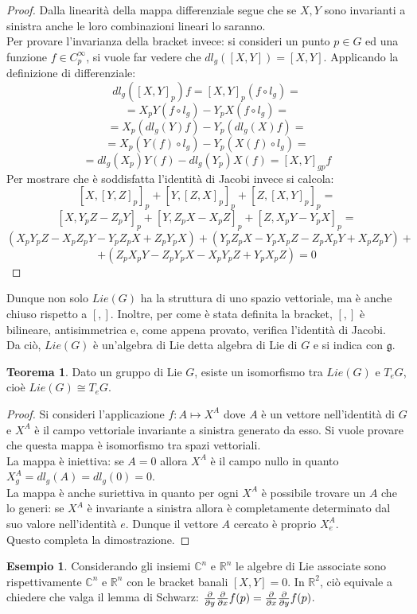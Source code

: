 \documentclass[12pt,a4paper]{report}
\theoremstyle{definition}
\newtheorem{Theo}[Def]{Teorema}
\theoremstyle{definition}
\newtheorem{Ex}[Def]{Esempio}
\theoremstyle{definition}
\theoremstyle{remark}
\begin{document}
\begin{proof}
	Dalla linearità della mappa differenziale segue che se $X,Y$ sono invarianti a sinistra anche le loro combinazioni lineari lo saranno.\\
	Per provare l'invarianza della bracket invece: si consideri un punto $p\in G$ ed una funzione $f\in C^\infty_p$, si vuole far vedere che $dl_g([X,Y])=[X,Y]$.
	Applicando la definizione di differenziale: $$dl_g([X,Y]_p)f=[X,Y]_p(f\circ l_g)=$$$$=X_pY(f\circ l_g)-Y_pX(f\circ l_g)=$$$$=X_p(dl_g(Y)f)-Y_p(dl_g(X)f)=$$
	$$=X_p(Y(f)\circ l_g)-Y_p(X(f)\circ l_g)=$$
	$$=dl_g(X_p)Y(f)-dl_g(Y_p)X(f)=[X,Y]_{gp}f$$ 
	Per mostrare che è soddisfatta l'identità di Jacobi invece si calcola:
	$$[X,[Y,Z]_p]_p+[Y,[Z,X]_p]_p+[Z,[X,Y]_p]_p=$$
	$$[X,Y_pZ-Z_pY]_p+[Y,Z_pX-X_pZ]_p+[Z,X_pY-Y_pX]_p=$$
	$$(X_pY_pZ-X_pZ_pY-Y_pZ_pX+Z_pY_pX)+(Y_pZ_pX-Y_pX_pZ-Z_pX_pY+X_pZ_pY)+$$$$+(Z_pX_pY-Z_pY_pX-X_pY_pZ+Y_pX_pZ)=0$$
\end{proof}
Dunque non solo $Lie(G)$ ha la struttura di uno spazio vettoriale, ma è anche chiuso rispetto a $[,]$. Inoltre, per come è stata definita la bracket, $[,]$ è bilineare, antisimmetrica e, come appena provato, verifica l'identità di Jacobi.\\
Da ciò, $Lie(G)$ è un'algebra di Lie detta algebra di Lie di $G$ e si indica con $\mathfrak{g}$.
\begin{Theo}
	Dato un gruppo di Lie $G$, esiste un isomorfismo tra $Lie(G)$ e $T_eG$, cioè $Lie(G)\cong T_eG$.
\end{Theo}
\begin{proof}
	Si consideri l'applicazione $f:A\mapsto X^A$ dove $A$ è un vettore nell'identità di $G$ e $X^A$ è il campo vettoriale invariante a sinistra generato da esso. Si vuole provare che questa mappa è isomorfismo tra spazi vettoriali.\\
	La mappa è iniettiva: se $A=0$ allora $X^A$ è il campo nullo in quanto $X^A_g=dl_g(A)=dl_g(0)=0$.\\
	La mappa è anche suriettiva in quanto per ogni $X^A$ è possibile trovare un $A$ che lo generi: se $X^A$ è invariante a sinistra allora è completamente determinato dal suo valore nell'identità $e$. Dunque il vettore $A$ cercato è proprio $X^A_e$.\\
	Questo completa la dimostrazione.  
\end{proof}
\begin{Ex}
	Considerando gli insiemi $\mathbb{C}^n$ e $\mathbb{R}^n$ le algebre di Lie associate sono rispettivamente $\mathbb{C}^n$ e $\mathbb{R}^n$ con le bracket banali $[X,Y]=0$. In $\mathbb{R}^2$, ciò equivale a chiedere che valga il lemma di Schwarz: ${\partial\over\partial y}{\partial\over\partial x}f(p)={\partial\over\partial x}{\partial\over\partial y}f(p)$.
\end{Ex}
\end{document}
